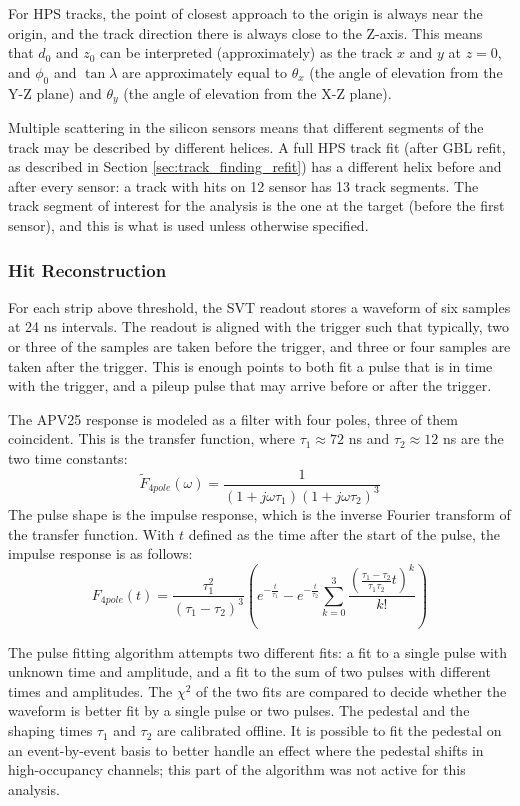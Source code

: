 For HPS tracks, the point of closest approach to the origin is always near the origin, and the track direction there is always close to the Z-axis.
This means that $d_0$ and $z_0$ can be interpreted (approximately) as the track $x$ and $y$ at $z=0$, and $\phi_0$ and $\tan\lambda$ are approximately equal to $\theta_x$ (the angle of elevation from the Y-Z plane) and $\theta_y$ (the angle of elevation from the X-Z plane).

Multiple scattering in the silicon sensors means that different segments of the track may be described by different helices.
A full HPS track fit (after GBL refit, as described in Section \ref{sec:track_finding_refit}) has a different helix before and after every sensor: a track with hits on 12 sensor has 13 track segments.
The track segment of interest for the analysis is the one at the target (before the first sensor), and this is what is used unless otherwise specified.

\subsubsection{Hit Reconstruction}
\label{sec:svt_hit_recon}
For each strip above threshold, the SVT readout stores a waveform of six samples at 24 ns intervals.
The readout is aligned with the trigger such that typically, two or three of the samples are taken before the trigger, and three or four samples are taken after the trigger.
This is enough points to both fit a pulse that is in time with the trigger, and a pileup pulse that may arrive before or after the trigger.

The APV25 response is modeled as a filter with four poles, three of them coincident.
This is the transfer function, where $\tau_1\approx 72$ ns and $\tau_2\approx 12$ ns are the two time constants:
\begin{equation}
    \tilde{F}_{4pole}(\omega) = \frac{1}{(1+j\omega\tau_1)(1+j\omega\tau_2)^3}
\end{equation}
The pulse shape is the impulse response, which is the inverse Fourier transform of the transfer function.
With $t$ defined as the time after the start of the pulse, the impulse response is as follows:
\begin{equation}
    F_{4pole}(t) = \frac{\tau_1^2}{(\tau_1-\tau_2)^3} \left( e^{-\frac{t}{\tau_1}} - e^{-\frac{t}{\tau_2}} \sum_{k=0}^3 \frac{\left(\frac{\tau_1-\tau_2}{\tau_1\tau_2}t\right)^k}{k!} \right)
\end{equation}

The pulse fitting algorithm attempts two different fits: a fit to a single pulse with unknown time and amplitude, and a fit to the sum of two pulses with different times and amplitudes.
The $\chi^2$ of the two fits are compared to decide whether the waveform is better fit by a single pulse or two pulses.
The pedestal and the shaping times $\tau_1$ and $\tau_2$ are calibrated offline.
It is possible to fit the pedestal on an event-by-event basis to better handle an effect where the pedestal shifts in high-occupancy channels; this part of the algorithm was not active for this analysis.

